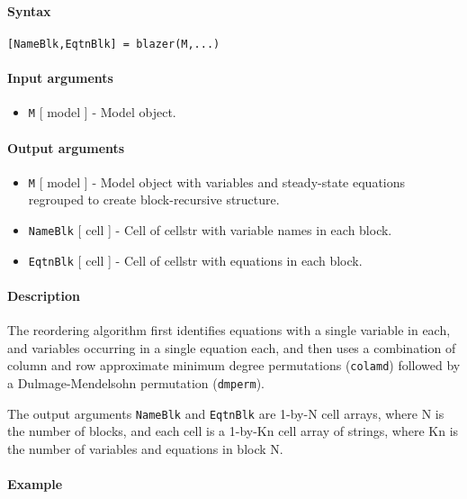 


	\paragraph{Syntax}\label{syntax}

\begin{verbatim}
[NameBlk,EqtnBlk] = blazer(M,...)
\end{verbatim}

\paragraph{Input arguments}\label{input-arguments}

\begin{itemize}
\itemsep1pt\parskip0pt
\item
  \texttt{M} {[} model {]} - Model object.
\end{itemize}

\paragraph{Output arguments}\label{output-arguments}

\begin{itemize}
\item
  \texttt{M} {[} model {]} - Model object with variables and
  steady-state equations regrouped to create block-recursive structure.
\item
  \texttt{NameBlk} {[} cell {]} - Cell of cellstr with variable names in
  each block.
\item
  \texttt{EqtnBlk} {[} cell {]} - Cell of cellstr with equations in each
  block.
\end{itemize}

\paragraph{Description}\label{description}

The reordering algorithm first identifies equations with a single
variable in each, and variables occurring in a single equation each, and
then uses a combination of column and row approximate minimum degree
permutations (\texttt{colamd}) followed by a Dulmage-Mendelsohn
permutation (\texttt{dmperm}).

The output arguments \texttt{NameBlk} and \texttt{EqtnBlk} are 1-by-N
cell arrays, where N is the number of blocks, and each cell is a 1-by-Kn
cell array of strings, where Kn is the number of variables and equations
in block N.

\paragraph{Example}\label{example}


